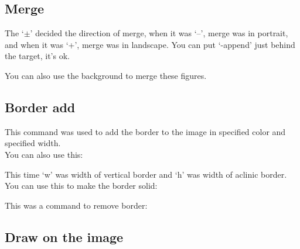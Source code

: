 \documentclass[12pt]{article}
\begin{document}
\subsection{Merge}
{\centering{}\par}\vspace{5mm}

The `$\pm$' decided the direction of merge, when it was `\---', merge was in portrait, and when it was `+', merge was in landscape. You can put `-append' just behind the target, it's ok.

You can also use the background to merge these figures.

\subsection{Border add}
{\centering{}\par}\vspace{5mm}

This command was used to add the border to the image in specified color and specified width.\\

You can also use this:\vspace{5mm}

{\centering{}\par}\vspace{5mm}

This time `w' was width of vertical border and `h' was width of aclinic border.\\

You can use this to make the border solid:\vspace{5mm}

{\centering{}\par}\vspace{5mm}

This was a command to remove border:\\

{\centering{}\par}

\subsection{Draw on the image}
{\centering{}\par}\vspace{5mm}
\end{document}
